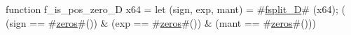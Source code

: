 function f_is_pos_zero_D   x64 = {
  let (sign, exp, mant) = #\hyperref[sailRISCVzfsplitzyD]{fsplit\_D}# (x64);
  (  (sign == #\hyperref[sailRISCVzzzeros]{zeros}#())
   & (exp  == #\hyperref[sailRISCVzzzeros]{zeros}#())
   & (mant == #\hyperref[sailRISCVzzzeros]{zeros}#()))
}
